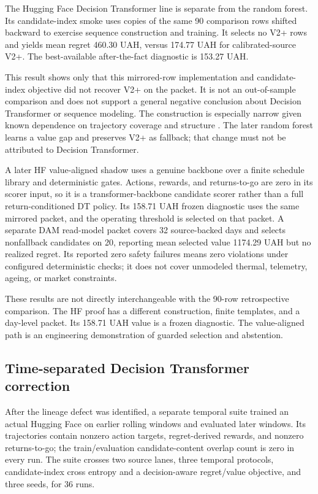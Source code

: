 The Hugging Face Decision Transformer line is separate from the random forest. Its candidate-index smoke uses copies of the same 90 comparison rows shifted backward to exercise sequence construction and training. It selects no V2+ rows and yields mean regret 460.30 UAH, versus 174.77 UAH for calibrated-source V2+. The best-available after-the-fact diagnostic is 153.27 UAH.

This result shows only that this mirrored-row implementation and candidate-index objective did not recover V2+ on the packet. It is not an out-of-sample comparison and does not support a general negative conclusion about Decision Transformer or sequence modeling. The construction is especially narrow given known dependence on trajectory coverage and structure \cite{bhargava2023whendt}. The later random forest learns a value gap and preserves V2+ as fallback; that change must not be attributed to Decision Transformer.

A later HF value-aligned shadow uses a genuine  backbone over a finite schedule library and deterministic gates. Actions, rewards, and returns-to-go are zero in its scorer input, so it is a transformer-backbone candidate scorer rather than a full return-conditioned DT policy. Its 158.71 UAH frozen diagnostic uses the same mirrored packet, and the operating threshold is selected on that packet. A separate DAM read-model packet covers 32 source-backed days and selects nonfallback candidates on 20, reporting mean selected value 1174.29 UAH but no realized regret. Its reported zero safety failures means zero violations under configured deterministic checks; it does not cover unmodeled thermal, telemetry, ageing, or market constraints.

These results are not directly interchangeable with the 90-row retrospective comparison. The HF proof has a different construction, finite templates, and a day-level packet. Its 158.71 UAH value is a frozen diagnostic. The value-aligned path is an engineering demonstration of guarded selection and abstention.

\subsection{Time-separated Decision Transformer correction}

After the lineage defect was identified, a separate temporal suite trained an actual Hugging Face  on earlier rolling windows and evaluated later windows. Its trajectories contain nonzero action targets, regret-derived rewards, and nonzero returns-to-go; the train/evaluation candidate-content overlap count is zero in every run. The suite crosses two source lanes, three temporal protocols, candidate-index cross entropy and a decision-aware regret/value objective, and three seeds, for 36 runs.

